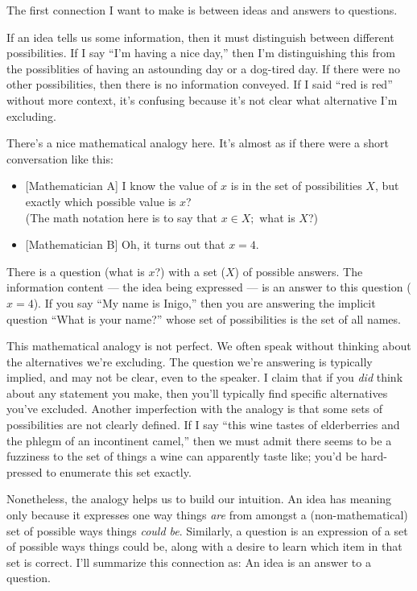 \documentclass[11pt, oneside]{article}   	%
\newenvironment{answer}[1]
  {\renewcommand\theinnercustomthm{#1}\innercustomthm}
  {\endinnercustomthm}
\begin{document}
The first connection I want to make is between ideas and answers to questions.

If an idea tells us some information, then it must distinguish between different
possibilities. If I say ``I'm having a nice day,'' then I'm distinguishing this
from the possiblities of having an astounding day or a dog-tired day.
If there were no other possibilities,
then there is no information conveyed. If I said
``red is red'' without more context,
it's confusing because it's not clear what
alternative I'm excluding.

There's a nice mathematical analogy here. It's almost as if there were a short
conversation like this:
\begin{itemize}
    \item{} [Mathematician A] I know the value of $x$ is in the set of
        possibilities $X$, but exactly which possible value is $x$?\\
        (The math notation here is to say that $x\in X;$ what is $X$?)
    \item{} [Mathematician B] Oh, it turns out that $x=4$.
\end{itemize}
There is a question (what is $x$?) with a set ($X$) of possible answers. The
information content --- the idea being expressed ---
is an answer to this question ($x=4$). If you say ``My name is Inigo,''
then you are answering the implicit question ``What is your name?'' whose set of
possibilities is the set of all names.

This mathematical analogy is not perfect.
We often speak without thinking about the
alternatives we're excluding.
The question we're answering
is typically implied, and may not be clear, even to
the speaker.
I claim that if you {\em did} think about any statement
you
make, then
you'll typically find specific alternatives you've excluded.
Another imperfection with the analogy is that some sets of possibilities are not
clearly defined.
If I say ``this wine tastes of
elderberries and the phlegm of an incontinent camel,'' then we must admit there
seems to be a fuzziness to the set of things a wine can apparently taste like;
you'd be hard-pressed to enumerate this set exactly.

Nonetheless, the analogy helps us to build our intuition.
An idea has meaning only because it expresses one way things
{\em are} from amongst a
(non-mathematical) set of possible ways things {\em could be}.
Similarly, a question is an expression of a set of possible ways things could
be, along with a desire to learn which item in that set is correct.
I'll summarize this
connection as:
\begin{answer}{4}
    An idea is an answer to a question.
\end{answer}
\end{document}
